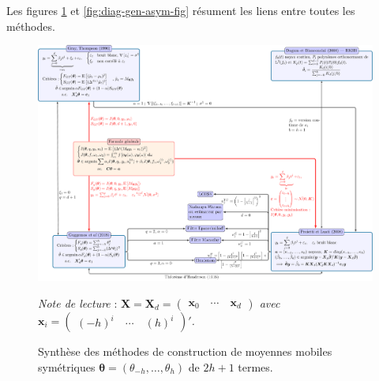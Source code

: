 \documentclass[
  12pt,
  a4paper,french]{article}
\newcommand\1{\mathds{1}}
\begin{document}
Les figures \ref{fig:diag-gen-sym-fig} et \ref{fig:diag-gen-asym-fig} résument les liens entre toutes les méthodes.

\newpage

\begin{figure}[!ht]

{\centering \includegraphics[width=0.8\textheight,angle=90]{img/diagrams/diag-gen-sym-1} 

}

\caption[Synthèse des méthodes de construction de moyennes mobiles symétriques \(\boldsymbol\theta=(\theta_{-h},\dots,\theta_{h})\) de \(2h+1\) termes]{Synthèse des méthodes de construction de moyennes mobiles symétriques \(\boldsymbol\theta=(\theta_{-h},\dots,\theta_{h})\) de \(2h+1\) termes.}\label{fig:diag-gen-sym-fig}

\footnotesize


\emph{Note de lecture} : \emph{\(\boldsymbol X = \boldsymbol X_d = \begin{pmatrix} \boldsymbol x_0 \quad\cdots \quad \boldsymbol x_d \end{pmatrix}\) avec \(\boldsymbol x_i=\begin{pmatrix} (-h)^i \quad \cdots \quad (h)^i\end{pmatrix}'\).}
\normalsize\end{figure}
\end{document}
